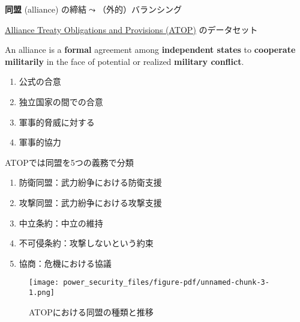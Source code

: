 \documentclass[
  xelatex,
  ja=standard]{bxjsarticle}
\providecommand{\tightlist}{%
  \setlength{\itemsep}{0pt}\setlength{\parskip}{0pt}}\usepackage{longtable,booktabs,array}
\begin{document}
\textbf{同盟} (alliance) の締結\(\leadsto\)（外的）バランシング

\href{http://www.atopdata.org/}{Alliance Treaty Obligations and
Provisions (ATOP)} のデータセット\citep{leeds2002}

\begin{tcolorbox}[enhanced jigsaw, colback=white, leftrule=.75mm, bottomrule=.15mm, opacityback=0, opacitybacktitle=0.6, toptitle=1mm, bottomtitle=1mm, toprule=.15mm, coltitle=black, title=\textcolor{quarto-callout-note-color}{\faInfo}\hspace{0.5em}{\href{http://www.atopdata.org/uploads/6/9/1/3/69134503/atop_5_1_codebook.pdf}{ATOPにおける同盟の定義}}, titlerule=0mm, colbacktitle=quarto-callout-note-color!10!white, breakable, arc=.35mm, colframe=quarto-callout-note-color-frame, rightrule=.15mm, left=2mm]

An alliance is a \textbf{formal} agreement among \textbf{independent
states} to \textbf{cooperate militarily} in the face of potential or
realized \textbf{military conflict}.

\end{tcolorbox}

\begin{enumerate}
\def\labelenumi{\arabic{enumi}.}
\tightlist
\item
  公式の合意
\item
  独立国家の間での合意
\item
  軍事的脅威に対する
\item
  軍事的協力
\end{enumerate}

ATOPでは同盟を5つの義務で分類

\begin{enumerate}
\def\labelenumi{\arabic{enumi}.}
\tightlist
\item
  防衛同盟：武力紛争における防衛支援
\item
  攻撃同盟：武力紛争における攻撃支援
\item
  中立条約：中立の維持
\item
  不可侵条約：攻撃しないという約束
\item
  協商：危機における協議
\end{enumerate}

\begin{figure}[htpb]

{\centering \texttt{[image: power\_security\_files/figure-pdf/unnamed-chunk-3-1.png]}

}

\caption{ATOPにおける同盟の種類と推移}

\end{figure}
\end{document}

